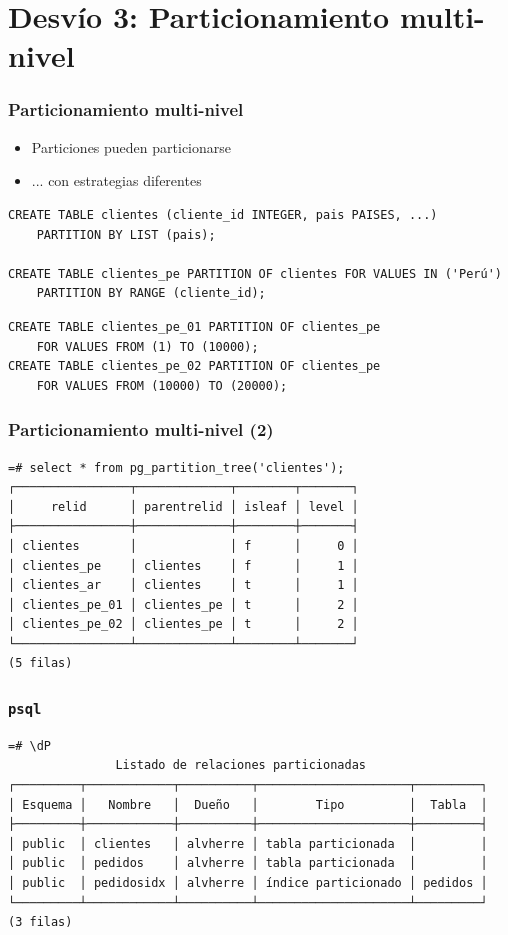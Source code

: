 \documentclass[ignorenonframetext,t]{beamer}
\begin{document}
\section{Desvío 3: Particionamiento multi-nivel}
\begin{frame}[fragile]
	\frametitle{Particionamiento multi-nivel}

	\begin{itemize}
		\item Particiones pueden particionarse
		\item ... con estrategias diferentes
	\end{itemize}

\begin{lstlisting}
CREATE TABLE clientes (cliente_id INTEGER, pais PAISES, ...)
    PARTITION BY LIST (pais);

CREATE TABLE clientes_pe PARTITION OF clientes FOR VALUES IN ('Perú')
	PARTITION BY RANGE (cliente_id);
\end{lstlisting}
\pause
\begin{lstlisting}
CREATE TABLE clientes_pe_01 PARTITION OF clientes_pe
    FOR VALUES FROM (1) TO (10000);
CREATE TABLE clientes_pe_02 PARTITION OF clientes_pe
    FOR VALUES FROM (10000) TO (20000);
\end{lstlisting}
\end{frame}

\begin{frame}[fragile]
	\frametitle{Particionamiento multi-nivel (2)}

	\small
	\begin{verbatim}
=# select * from pg_partition_tree('clientes');
┌────────────────┬─────────────┬────────┬───────┐
│     relid      │ parentrelid │ isleaf │ level │
├────────────────┼─────────────┼────────┼───────┤
│ clientes       │             │ f      │     0 │
│ clientes_pe    │ clientes    │ f      │     1 │
│ clientes_ar    │ clientes    │ t      │     1 │
│ clientes_pe_01 │ clientes_pe │ t      │     2 │
│ clientes_pe_02 │ clientes_pe │ t      │     2 │
└────────────────┴─────────────┴────────┴───────┘
(5 filas)
	\end{verbatim}
\end{frame}

\begin{frame}[fragile]
	\frametitle{\texttt{psql}}

	\small
\begin{verbatim}
=# \dP
               Listado de relaciones particionadas
┌─────────┬────────────┬──────────┬─────────────────────┬─────────┐
│ Esquema │   Nombre   │  Dueño   │        Tipo         │  Tabla  │
├─────────┼────────────┼──────────┼─────────────────────┼─────────┤
│ public  │ clientes   │ alvherre │ tabla particionada  │         │
│ public  │ pedidos    │ alvherre │ tabla particionada  │         │
│ public  │ pedidosidx │ alvherre │ índice particionado │ pedidos │
└─────────┴────────────┴──────────┴─────────────────────┴─────────┘
(3 filas)
\end{verbatim}
\end{frame}
\end{document}
